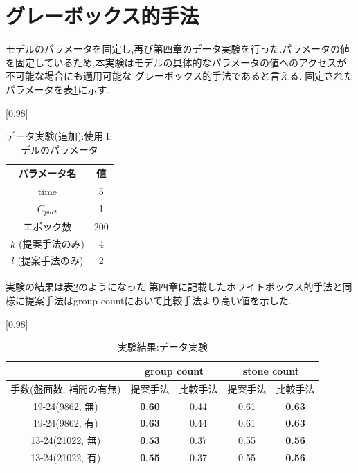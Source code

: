 \section{グレーボックス的手法}
\label{sec:gray}
モデルのパラメータを固定し,再び第四章のデータ実験を行った.パラメータの値を固定しているため,本実験はモデルの具体的なパラメータの値へのアクセスが不可能な場合にも適用可能な
グレーボックス的手法であると言える.
固定されたパラメータを表\ref{table:param-data-extra}に示す.
\begin{table}[H]
	\caption{データ実験(追加):使用モデルのパラメータ}
	\centering
	\scalebox{0.98}[0.98]{
		\begin{tabular}{c|c}
			パラメータ名 & 値 \\ \hline
			time    & 5 \\ 
			$C_{puct}$    & 1 \\
			エポック数 & 200 \\
			$k$ (提案手法のみ)     & 4 \\
			$l$ (提案手法のみ)     & 2 \\
		\end{tabular}
	}
	\label{table:param-data-extra}
\end{table}

実験の結果は表\ref{table:result-offline}のようになった.第四章に記載したホワイトボックス的手法と同様に提案手法はgroup countにおいて比較手法より高い値を示した.
\begin{table}[H]
	\caption{実験結果:データ実験}
	\centering
	\scalebox{0.98}[0.98]{
		\begin{tabular}{c|c|c|c|c}
			\multicolumn{1}{c}{} & \multicolumn{2}{|c|}{group count} 
			& \multicolumn{2}{c|}{stone count}\\ \hline \hline
			手数(盤面数, 補間の有無)    & 提案手法 & 比較手法 & 提案手法 & 比較手法 \\ \hline
			19-24(9862, 無)    & \bf{0.60} & 0.44 & 0.61 & \bf{0.63} \\
			19-24(9862, 有)    & \bf{0.63} & 0.44 & 0.61 & \bf{0.63}  \\
			13-24(21022, 無)   & \bf{0.53} & 0.37 & 0.55 & \bf{0.56}  \\
			13-24(21022, 有)   & \bf{0.55} & 0.37 & 0.55 & \bf{0.56}  \\
		\end{tabular}
	}
	\label{table:result-offline}
\end{table}
